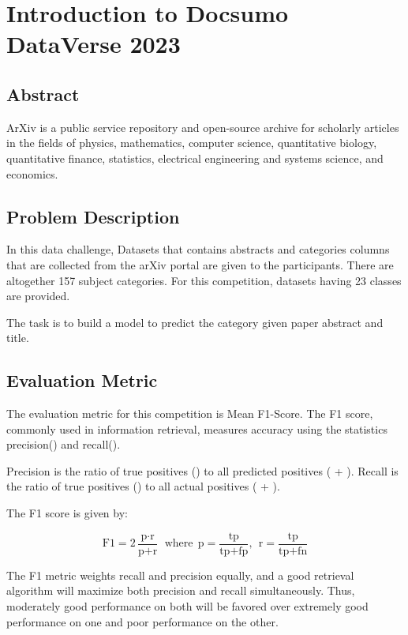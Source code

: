 
\chapter{Introduction to Docsumo DataVerse 2023}
\section{Abstract}
ArXiv is a public service repository and open-source archive for scholarly articles in the fields of physics, mathematics, computer science, quantitative biology, quantitative finance, statistics, electrical engineering and systems science, and economics.

\section{Problem Description}
In this data challenge, Datasets that contains abstracts and categories columns that are collected from the arXiv portal are given to the participants. There are altogether 157 subject categories. For this competition, datasets having 23 classes are provided.

The task is to build a model to predict the category given paper abstract and title.

\section{Evaluation Metric}
The evaluation metric for this competition is Mean F1-Score. The F1 score, commonly used in information retrieval, measures accuracy using the statistics precision() and recall().

Precision is the ratio of true positives () to all predicted positives ( + ). Recall is the ratio of true positives () to all actual positives ( + ).

The F1 score is given by:

\[ \text{F1} = 2\frac{\text{p} \cdot \text{r}}{\text{p}+\text{r}}\ \ \mathrm{where}\ \ \text{p} = \frac{\text{tp}}{\text{tp}+\text{fp}},\ \ \text{r} = \frac{\text{tp}}{\text{tp}+\text{fn}} \]

The F1 metric weights recall and precision equally, and a good retrieval algorithm will maximize both precision and recall simultaneously. Thus, moderately good performance on both will be favored over extremely good performance on one and poor performance on the other.



